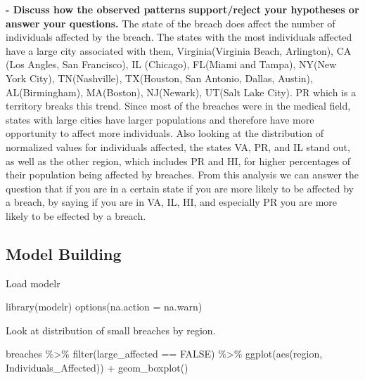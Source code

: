 \documentclass[
]{article}
\newenvironment{Shaded}{\begin{snugshade}}{\end{snugshade}}
\newcommand{\AttributeTok}[1]{\textcolor[rgb]{0.77,0.63,0.00}{#1}}
\newcommand{\ConstantTok}[1]{\textcolor[rgb]{0.00,0.00,0.00}{#1}}
\newcommand{\FunctionTok}[1]{\textcolor[rgb]{0.00,0.00,0.00}{#1}}
\newcommand{\NormalTok}[1]{#1}
\newcommand{\SpecialCharTok}[1]{\textcolor[rgb]{0.00,0.00,0.00}{#1}}
\begin{document}
\textbf{- Discuss how the observed patterns support/reject your
hypotheses or answer your questions.} The state of the breach does
affect the number of individuals affected by the breach. The states with
the most individuals affected have a large city associated with them,
Virginia(Virginia Beach, Arlington), CA (Los Angles, San Francisco), IL
(Chicago), FL(Miami and Tampa), NY(New York City), TN(Nashville),
TX(Houston, San Antonio, Dallas, Austin), AL(Birmingham), MA(Boston),
NJ(Newark), UT(Salt Lake City). PR which is a territory breaks this
trend. Since most of the breaches were in the medical field, states with
large cities have larger populations and therefore have more opportunity
to affect more individuals. Also looking at the distribution of
normalized values for individuals affected, the states VA, PR, and IL
stand out, as well as the other region, which includes PR and HI, for
higher percentages of their population being affected by breaches. From
this analysis we can answer the question that if you are in a certain
state if you are more likely to be affected by a breach, by saying if
you are in VA, IL, HI, and especially PR you are more likely to be
effected by a breach.

\hypertarget{model-building}{%
\subsection{Model Building}\label{model-building}}

Load modelr

\begin{Shaded}
\begin{Highlighting}[]
\FunctionTok{library}\NormalTok{(modelr)}
\FunctionTok{options}\NormalTok{(}\AttributeTok{na.action =}\NormalTok{ na.warn)}
\end{Highlighting}
\end{Shaded}

Look at distribution of small breaches by region.

\begin{Shaded}
\begin{Highlighting}[]
\NormalTok{breaches }\SpecialCharTok{\%\textgreater{}\%}
  \FunctionTok{filter}\NormalTok{(large\_affected }\SpecialCharTok{==} \ConstantTok{FALSE}\NormalTok{) }\SpecialCharTok{\%\textgreater{}\%}
  \FunctionTok{ggplot}\NormalTok{(}\FunctionTok{aes}\NormalTok{(region, Individuals\_Affected)) }\SpecialCharTok{+}
  \FunctionTok{geom\_boxplot}\NormalTok{()}
\end{Highlighting}
\end{Shaded}
\end{document}
